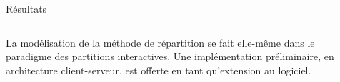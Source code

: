 \begin{columns}[t]
\begin{column}{\onecolwid}
          \begin{block}{Résultats}
          	\begin{columns}[t]
          		\begin{column}{\onecolwid}\justify
          			La modélisation de la méthode de répartition se fait elle-même dans le paradigme des partitions interactives.
          			Une implémentation préliminaire, en architecture client-serveur, est offerte en tant qu'extension au logiciel.
          		\end{column}
          	\end{columns}        
            \end{block}
        \end{column}         
   \begin{column}{\sepwid}\end{column}		
\end{columns}

